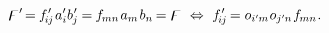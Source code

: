 \nopagebreak\vspace{-0.2em}\begin{equation*}
\digamma' \hspace{-0.3ex}
= \hspace{-0.1ex}
f\hspace{.1ex}'_{\hspace{-0.55ex}i\hspace{-0.1ex}j} \hspace{.2ex} a'_i b\hspace{.1ex}'_{\hspace{-0.2ex}j} \hspace{-0.1ex}
= \hspace{-0.1ex}
f_{\hspace{-0.1ex}mn} \hspace{.4ex} \tikzmark{beginComponentOfFirstVector} \hspace{-0.2ex} a_m \tikzmark{endComponentOfFirstVector} \hspace{.2ex} \tikzmark{beginComponentOfSecondVector} b_n \hspace{-0.2ex} \tikzmark{endComponentOfSecondVector}
= \digamma
\hspace{.8ex}\Leftrightarrow\hspace{.8ex}
f\hspace{.1ex}'_{\hspace{-0.55ex}i\hspace{-0.1ex}j} \hspace{-0.2ex} = \cosinematrix{i'\hspace{-0.1ex}m} \hspace{.1ex} \cosinematrix{j'\hspace{-0.1ex}n} \hspace{.16ex} f_{\hspace{-0.1ex}mn}
\hspace{.1ex} .
\end{equation*}

